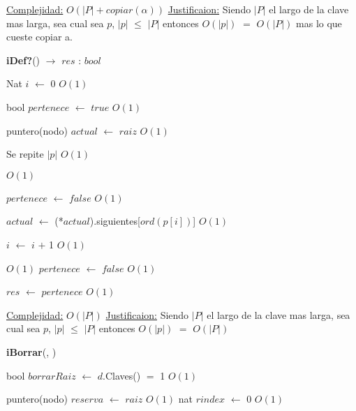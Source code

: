\begin{Algoritmos}
\begin{algorithm}[H]
\begin{algorithmic}[1]
\medskip
\State \underline{Complejidad:} $O(|P| + copiar(\alpha))$
\State \underline{Justificaion:} Siendo $|P|$ el largo de la clave mas larga, sea cual sea $p$, $|p|$ $\leq$ $|P|$ entonces 	$O(|p|)$ $=$ $O(|P|)$ mas lo que cueste copiar a.


\end{algorithmic}
\end{algorithm}


\begin{algorithm}[H]
{\textbf{iDef?}() $\to$ $res$ : $bool$}
\begin{algorithmic}[1]

\State Nat $i$ $\gets$ $0$ \Comment $O(1)$

\State bool $pertenece$ $\gets$ $true$ \Comment $O(1)$

\State puntero(nodo) $actual$ $\gets$ $raiz$ \Comment $O(1)$

   \Comment Se repite $|p|$ $O(1)$


	 \Comment $O(1)$

		\State $pertenece$ $\gets$ $false$ \Comment $O(1)$

	\EndIf

	\State $actual$ $\gets$ (*$actual$).siguientes[$ord(p[i])$] \Comment $O(1)$

	\State $i$ $\gets$ $i$ $+$ 1 \Comment $O(1)$
\EndWhile

 \Comment $O(1)$
	\State $pertenece$ $\gets$ $false$ \Comment $O(1)$
\EndIf

\State $res$ $\gets$ $pertenece$ \Comment $O(1)$

\medskip
\State \underline{Complejidad:} $O(|P|)$
\State \underline{Justificaion:} Siendo $|P|$ el largo de la clave mas larga, sea cual sea $p$, $|p|$ $\leq$ $|P|$ entonces 	$O(|p|)$ $=$ $O(|P|)$

\end{algorithmic}
\end{algorithm}



\begin{algorithm}[H]
{\textbf{iBorrar}(, })
\begin{algorithmic}[1]

\State bool $borrarRaiz$ $\gets$ $d$.Claves() $=$ 1 \Comment $O(1)$

\State puntero(nodo) $reserva$ $\gets$ $raiz$ \Comment $O(1)$
\State nat $rindex$ $\gets$ 0 \Comment $O(1)$


\end{algorithmic}
\end{algorithm}
\end{Algoritmos}
